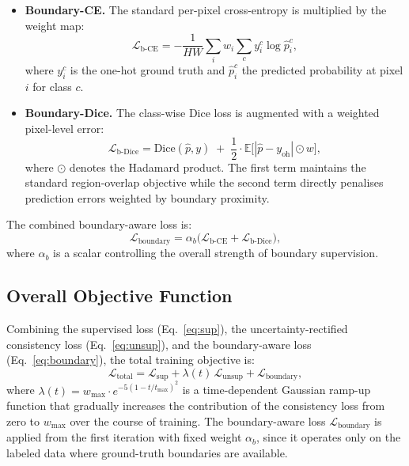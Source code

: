 \begin{itemize}
    \item \textbf{Boundary-CE.} The standard per-pixel cross-entropy is multiplied by the weight map:
    \begin{equation}
        \mathcal{L}_\text{b-CE} = -\frac{1}{HW}\sum_{i} w_i \sum_{c} y_i^c \log \hat{p}_i^c,
        \label{eq:bce}
    \end{equation}
    where $y_i^c$ is the one-hot ground truth and $\hat{p}_i^c$ the predicted probability at pixel $i$ for class $c$.

    \item \textbf{Boundary-Dice.} The class-wise Dice loss is augmented with a weighted pixel-level error:
    \begin{equation}
        \mathcal{L}_\text{b-Dice} = \text{Dice}(\hat{p}, y) \;+\; \frac{1}{2} \cdot \mathbb{E}\bigl[|\hat{p} - y_\text{oh}| \odot w\bigr],
        \label{eq:bdice}
    \end{equation}
    where $\odot$ denotes the Hadamard product. The first term maintains the standard region-overlap objective while the second term directly penalises prediction errors weighted by boundary proximity.
\end{itemize}

\noindent The combined boundary-aware loss is:
\begin{equation}
    \mathcal{L}_\text{boundary} = \alpha_b \bigl(\mathcal{L}_\text{b-CE} + \mathcal{L}_\text{b-Dice}\bigr),
    \label{eq:boundary}
\end{equation}
where $\alpha_b$ is a scalar controlling the overall strength of boundary supervision.


\subsection{Overall Objective Function}
\label{sec:urpc-loss}

Combining the supervised loss (Eq.~\ref{eq:sup}), the uncertainty-rectified consistency loss (Eq.~\ref{eq:unsup}), and the boundary-aware loss (Eq.~\ref{eq:boundary}), the total training objective is:
\begin{equation}
    \mathcal{L}_\text{total} = \mathcal{L}_\text{sup} + \lambda(t)\,\mathcal{L}_\text{unsup} + \mathcal{L}_\text{boundary},
    \label{eq:total}
\end{equation}
where $\lambda(t) = w_\text{max} \cdot e^{-5(1-t/t_\text{max})^2}$ is a time-dependent Gaussian ramp-up function that gradually increases the contribution of the consistency loss from zero to $w_\text{max}$ over the course of training. The boundary-aware loss $\mathcal{L}_\text{boundary}$ is applied from the first iteration with fixed weight $\alpha_b$, since it operates only on the labeled data where ground-truth boundaries are available.

